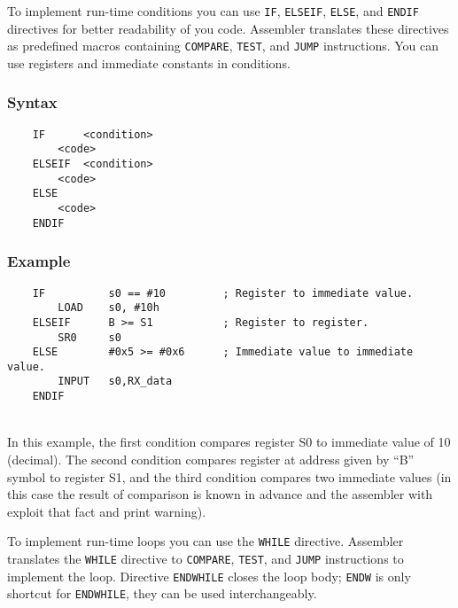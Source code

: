     \clearpage
        To implement run-time conditions you can use \texttt{IF}, \texttt{ELSEIF}, \texttt{ELSE}, and \texttt{ENDIF} directives for better readability of you code. Assembler translates these directives as predefined macros containing \texttt{COMPARE}, \texttt{TEST}, and \texttt{JUMP} instructions. You can use registers and immediate constants in conditions.

        \subsubsection{Syntax}
            \verb'    IF      <condition>'\\
            \verb'        <code>'\\
            \verb'    ELSEIF  <condition>'\\
            \verb'        <code>'\\
            \verb'    ELSE'\\
            \verb'        <code>'\\
            \verb'    ENDIF'

        \subsubsection{Example}
            \verb'    IF          s0 == #10         ; Register to immediate value.'\\
            \verb'        LOAD    s0, #10h'\\
            \verb'    ELSEIF      B >= S1           ; Register to register.'\\
            \verb'        SR0     s0'\\
            \verb'    ELSE        #0x5 >= #0x6      ; Immediate value to immediate value.'\\
            \verb'        INPUT   s0,RX_data'\\
            \verb'    ENDIF'

            ~\\In this example, the first condition compares register S0 to immediate value of 10 (decimal). The second condition compares register at address given by ``B'' symbol to register S1, and the third condition compares two immediate values (in this case the result of comparison is known in advance and the assembler with exploit that fact and print warning).

    \clearpage
        To implement run-time loops you can use the \texttt{WHILE} directive. Assembler translates the \texttt{WHILE} directive to \texttt{COMPARE}, \texttt{TEST}, and \texttt{JUMP} instructions to implement the loop. Directive \texttt{ENDWHILE} closes the loop body; \texttt{ENDW} is only shortcut for \texttt{ENDWHILE}, they can be used interchangeably.

